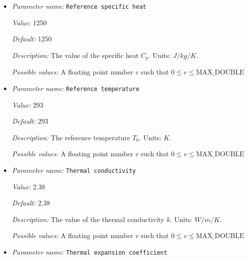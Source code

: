 \begin{itemize}
{\it Value:} 3300


{\it Default:} 3300


{\it Description:} Reference density $\rho_0$. Units: $kg/m^3$.


{\it Possible values:} A floating point number $v$ such that $0 \leq v \leq \text{MAX\_DOUBLE}$
\item {\it Parameter name:} {\tt Reference specific heat}
\label{parameters:Material model/Latent heat/Reference specific heat}


{\it Value:} 1250


{\it Default:} 1250


{\it Description:} The value of the specific heat $C_p$. Units: $J/kg/K$.


{\it Possible values:} A floating point number $v$ such that $0 \leq v \leq \text{MAX\_DOUBLE}$
\item {\it Parameter name:} {\tt Reference temperature}
\label{parameters:Material model/Latent heat/Reference temperature}


{\it Value:} 293


{\it Default:} 293


{\it Description:} The reference temperature $T_0$. Units: $K$.


{\it Possible values:} A floating point number $v$ such that $0 \leq v \leq \text{MAX\_DOUBLE}$
\item {\it Parameter name:} {\tt Thermal conductivity}
\label{parameters:Material model/Latent heat/Thermal conductivity}


{\it Value:} 2.38


{\it Default:} 2.38


{\it Description:} The value of the thermal conductivity $k$. Units: $W/m/K$.


{\it Possible values:} A floating point number $v$ such that $0 \leq v \leq \text{MAX\_DOUBLE}$
\item {\it Parameter name:} {\tt Thermal expansion coefficient}
\label{parameters:Material model/Latent heat/Thermal expansion coefficient}



\end{itemize}
